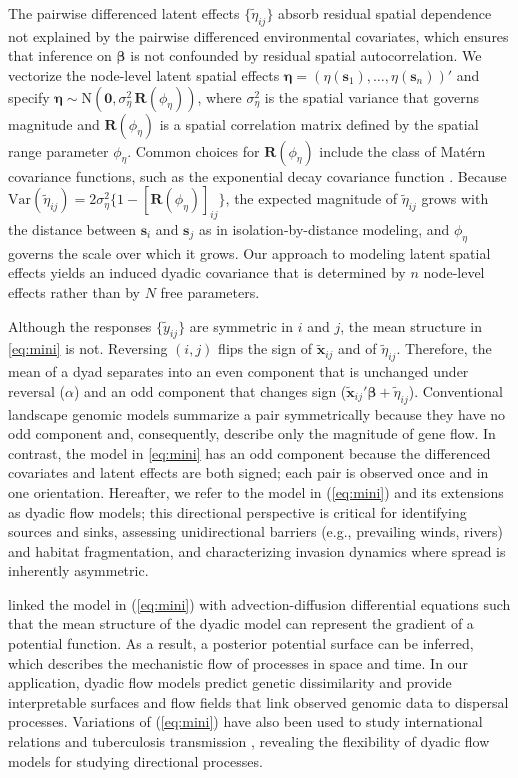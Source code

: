 \documentclass{article}
\begin{document}
The pairwise differenced latent effects $\{\widetilde{\eta}_{ij}\}$ absorb residual spatial dependence not explained by the pairwise differenced environmental covariates, which ensures that inference on $\boldsymbol\beta$ is not confounded by residual spatial autocorrelation. We vectorize the node-level latent spatial effects $\boldsymbol{\eta}=(\eta(\mathbf{s}_1),\dots,\eta(\mathbf{s}_n))'$ and specify
$\boldsymbol{\eta}\sim \text{N}(\mathbf{0},\sigma_\eta^2\,\mathbf{R}(\phi_\eta))$, where $\sigma^2_\eta$ is the spatial variance that governs magnitude and $\mathbf{R}(\phi_\eta)$ is a spatial correlation matrix defined by the spatial range parameter $\phi_\eta$. Common choices for $\mathbf{R}(\phi_\eta)$ include the class of Matérn covariance functions, such as the exponential decay covariance function \citep{cressie2015statistics}.
Because $\text{Var}(\widetilde{\eta}_{ij})=2\sigma^2_\eta\{1-[\mathbf{R}(\phi_\eta)]_{ij}\}$, the expected magnitude of $\widetilde{\eta}_{ij}$ grows with the distance between $\mathbf{s}_i$ and $\mathbf{s}_j$ as in isolation-by-distance modeling, and $\phi_\eta$ governs the scale over which it grows.
Our approach to modeling latent spatial effects yields an induced dyadic covariance that is determined by $n$ node-level effects rather than by $N$ free parameters.

Although the responses $\{\widetilde{y}_{ij}\}$ are symmetric in $i$ and $j$, the mean structure in \eqref{eq:mini} is not. Reversing $(i,j)$ flips the sign of $\widetilde{\mathbf{x}}_{ij}$ and of $\widetilde{\eta}_{ij}$.
Therefore, the mean of a dyad separates into an even component that is unchanged under reversal ($\alpha$) and an odd component that changes sign ($\widetilde{\mathbf{x}}_{ij}'\boldsymbol{\beta}+\widetilde{\eta}_{ij}$).
Conventional landscape genomic models summarize a pair symmetrically because they have no odd component and, consequently, describe only the magnitude of gene flow. In contrast, the model in \eqref{eq:mini} has an odd component because the differenced covariates and latent effects are both signed; each pair is observed once and in one orientation.
Hereafter, we refer to the model in (\ref{eq:mini}) and its extensions as dyadic flow models; this directional perspective is critical for identifying sources and sinks, assessing unidirectional barriers (e.g., prevailing winds, rivers) and habitat fragmentation, and characterizing invasion dynamics where spread is inherently asymmetric. 

\cite{schwob2024composite} linked the model in (\ref{eq:mini}) with advection-diffusion differential equations such that the mean structure of the dyadic model can represent the gradient of a potential function. As a result, a posterior potential surface can be inferred, which describes the mechanistic flow of processes in space and time. 
In our application, dyadic flow models predict genetic dissimilarity and provide interpretable surfaces and flow fields that link observed genomic data to dispersal processes.
Variations of (\ref{eq:mini}) have also been used to study international relations \citep{minhas2022taking} and tuberculosis transmission \citep{warren2023spatial}, revealing the flexibility of dyadic flow models for studying directional processes.
\end{document}
